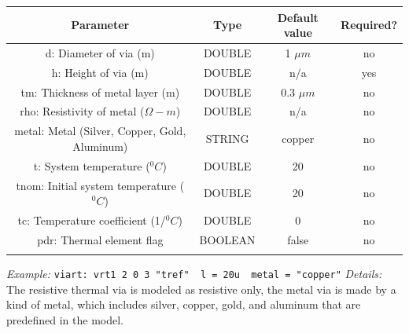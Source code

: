 \documentclass{article}
\begin{document}
\begin{table}[H]
\begin{tabular}{|c|c|c|c|}
\hline
Parameter&Type&Default value&Required?\\
\hline
d: Diameter of via (m) & DOUBLE &  1 $\mu m$ & no \\
\hline
h: Height of via (m) & DOUBLE & n/a & yes \\
\hline
tm: Thickness of metal layer (m) & DOUBLE & 0.3 $\mu m$  & no \\
\hline
rho: Resistivity of metal  ($\Omega-m$)& DOUBLE & n/a & no \\
\hline
metal: Metal (Silver, Copper, Gold, Aluminum) & STRING & copper & no \\
\hline
t: System temperature ($^0C$) & DOUBLE & 20 & no \\
\hline
tnom: Initial system temperature ($^0C$) & DOUBLE & 20 & no \\
\hline
tc: Temperature coefficient (1/$^0C$) & DOUBLE & 0 & no \\
\hline
pdr:  Thermal element flag & BOOLEAN & false & no \\
\par
\hline
\end{tabular}
\end{table}
\noindent\myThickLine
\newline
\textit{Example:}
\newline
\texttt{viart:\ vrt1\ 2\ 0\ 3\ "tref" \ l = 20u \ metal = "copper"}
\newline
\myThickLine
\textit{Details:}\\
The resistive thermal via is modeled as resistive only, the metal via is made by a kind of metal, which includes silver, copper, gold, and aluminum that are predefined in the model. \\
\end{document}
